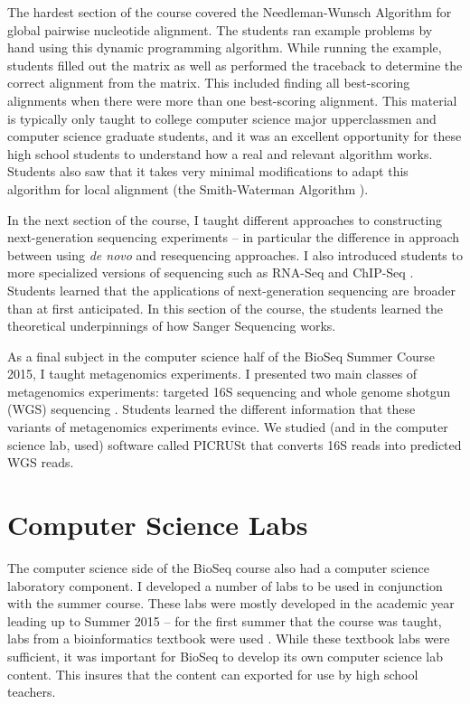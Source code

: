 \documentclass{report}
\begin{document}
The hardest section of the course covered the Needleman-Wunsch Algorithm \cite{needleman1970general} for global pairwise nucleotide alignment. The students ran example problems by hand using this dynamic programming algorithm. While running the example, students filled out the matrix as well as performed the traceback to determine the correct alignment from the matrix. This included finding all best-scoring alignments when there were more than one best-scoring alignment. This material is typically only taught to college computer science major upperclassmen and computer science graduate students, and it was an excellent opportunity for these high school students to understand how a real and relevant algorithm works. Students also saw that it takes very minimal modifications to adapt this algorithm for local alignment (the Smith-Waterman Algorithm \cite{smith1981identification}).

In the next section of the course, I taught different approaches to constructing next-generation sequencing experiments -- in particular the difference in approach between using \emph{de novo} and resequencing approaches. I also introduced students to more specialized versions of sequencing such as RNA-Seq \cite{nagalakshmi2008transcriptional} and ChIP-Seq \cite{johnson2007genome}. Students learned that the applications of next-generation sequencing are broader than at first anticipated. In this section of the course, the students learned the theoretical underpinnings of how Sanger Sequencing \cite{sanger1977dna} works.

As a final subject in the computer science half of the BioSeq Summer Course 2015, I taught metagenomics experiments. I presented two main classes of metagenomics experiments: targeted 16S sequencing \cite{qin2010human} and whole genome shotgun (WGS) sequencing \cite{chen2005bioinformatics}. Students learned the different information that these variants of metagenomics experiments evince. We studied (and in the computer science lab, used) software called PICRUSt \cite{langille2013predictive} that converts 16S reads into predicted WGS reads. 

\section{Computer Science Labs}
The computer science side of the BioSeq course also had a computer science laboratory component. I developed a number of labs to be used in conjunction with the summer course. These labs were mostly developed in the academic year leading up to Summer 2015 -- for the first summer that the course was taught, labs from a bioinformatics textbook were used \cite{st2013exploring}. While these textbook labs were sufficient, it was important for BioSeq to develop its own computer science lab content. This insures that the content can exported for use by high school teachers.
\end{document}
